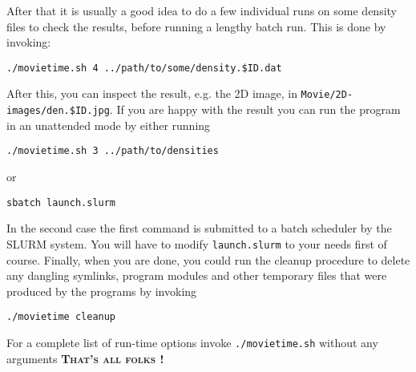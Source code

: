 \documentclass[10pt,a4paper]{article}
\begin{document}
After that it is usually a good idea to do a few individual runs on some density files to check the results, before running a lengthy batch run. This is done by invoking:
\begin{verbatim}
./movietime.sh 4 ../path/to/some/density.$ID.dat
\end{verbatim}
After this, you can inspect the result, e.g. the 2D image, in \verb+Movie/2D-images/den.$ID.jpg+. If you are happy with the result you can run the program in an unattended mode by either running
\begin{verbatim}
./movietime.sh 3 ../path/to/densities
\end{verbatim}
or
\begin{verbatim}
sbatch launch.slurm
\end{verbatim}
In the second case the first command is submitted to a batch scheduler by the SLURM system. You will have to modify \verb+launch.slurm+ to your needs first of course.
Finally, when you are done, you could run the cleanup procedure to delete any dangling symlinks, program modules and other temporary files that were produced by the programs by invoking
\begin{verbatim}
./movietime cleanup
\end{verbatim}
For a complete list of run-time options invoke \verb+./movietime.sh+ without any arguments
\center\textbf{\Huge{\textsc{That's all folks !}}}
\end{document}
